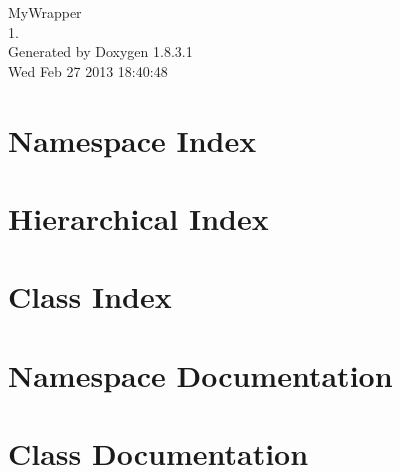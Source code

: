 \documentclass{book}
\begin{document}
\hypersetup{pageanchor=false,citecolor=blue}
\begin{titlepage}
\vspace*{7cm}
\begin{center}
{\Large My\-Wrapper \\[1ex]\large 1. }\\
\vspace*{1cm}
{\large Generated by Doxygen 1.8.3.1}\\
\vspace*{0.5cm}
{\small Wed Feb 27 2013 18:40:48}\\
\end{center}
\end{titlepage}
\clearemptydoublepage
{}
\tableofcontents
\clearemptydoublepage
{}
\hypersetup{pageanchor=true,citecolor=blue}
\chapter{Namespace Index}

\chapter{Hierarchical Index}

\chapter{Class Index}

\chapter{Namespace Documentation}

\chapter{Class Documentation}
















































\printindex
\end{document}

